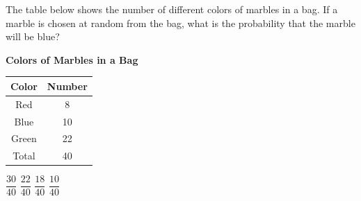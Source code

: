 \question[1]
The table below shows the number of different colors of marbles in a bag. If a marble is chosen at random from the bag, what is the probability that the marble will be blue?
\vspace{0.5em}
\begin{center}
  \renewcommand{\arraystretch}{1.3}
  \setlength{\tabcolsep}{0.5em}
  {\textbf{Colors of Marbles in a Bag}\par}
  \vspace{0.35em}
  \begin{tabular}{|c|c|}
    \hline
    \rowcolor[HTML]{E0E0E0}
    \textbf{Color} & \textbf{Number} \\
    \hline
    Red & 8 \\
    \hline
    Blue & 10 \\
    \hline
    Green & 22 \\
    \hline
    Total & 40 \\
    \hline
  \end{tabular}
\end{center}
\begin{choices}
  \choice $\dfrac{30}{40}$
  \choice $\dfrac{22}{40}$
  \choice $\dfrac{18}{40}$
  \CorrectChoice $\dfrac{10}{40}$
\end{choices}

\newpage


